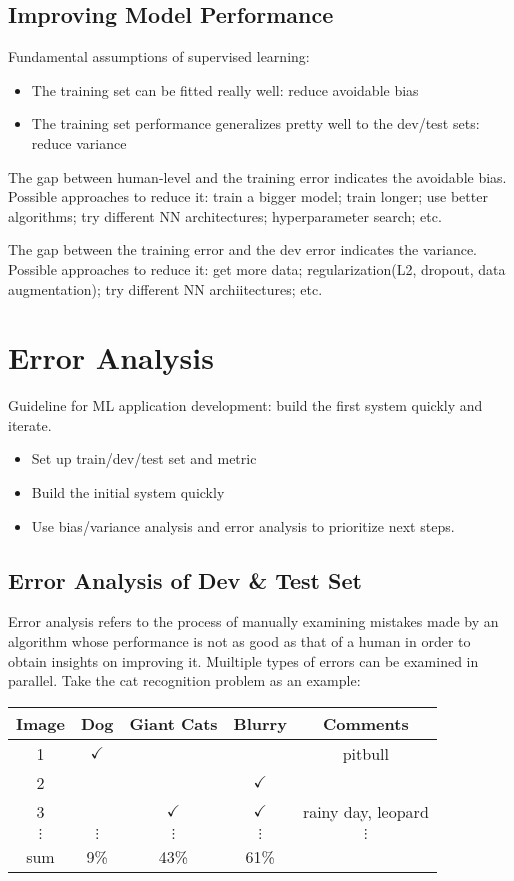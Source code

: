 \subsection{Improving Model Performance}
Fundamental assumptions of supervised learning:
\begin{itemize}
  \item The training set can be fitted really well: reduce avoidable bias
  \item The training set performance generalizes pretty well to the dev/test sets: reduce variance
\end{itemize}
The gap between human-level and the training error indicates the avoidable bias. Possible approaches to reduce it: train a bigger model; train longer; use better algorithms; try different NN architectures; hyperparameter search; etc.

The gap between the training error and the dev error indicates the variance. Possible approaches to reduce it: get more data; regularization(L2, dropout, data augmentation); try different NN archiitectures; etc.
\section{Error Analysis}
Guideline for ML application development: build the first system quickly and iterate.
  \begin{itemize}
    \item Set up train/dev/test set and metric
    \item Build the initial system quickly
    \item Use bias/variance analysis and error analysis to prioritize next steps.
  \end{itemize}
\subsection{Error Analysis of Dev \& Test Set}
Error analysis refers to the process of manually examining mistakes made by an algorithm whose performance is not as good as that of a human in order to obtain insights on improving it. Muiltiple types of errors can be examined in parallel. Take the cat recognition problem as an example:

\begin{table}[ht]
  \centering
  \begin{tabular}{c|cccc}
    Image & Dog & Giant Cats & Blurry & Comments \\\hline
    1 & $\checkmark$ & & & pitbull \\
    2 &  & & $\checkmark$ &  \\
    3 & & $\checkmark$ & $\checkmark$ & rainy day, \newline leopard \\
    $\vdots$ & $\vdots$ & $\vdots$ & $\vdots$ & $\vdots$ \\
    sum & 9\% & 43\% & 61\% \\
  \end{tabular}
\end{table}

